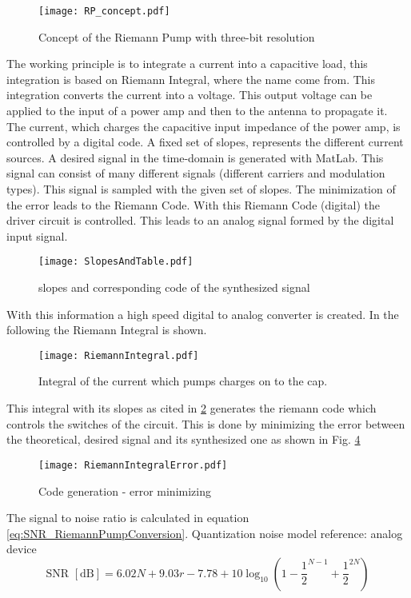 \begin{figure}[ht]
	\centering
  \texttt{[image: RP\_concept.pdf]}
	\caption{Concept of the Riemann Pump with three-bit resolution}
	\label{fig:RiemannPumpConcept}
\end{figure}

 The working principle is to integrate a current into a capacitive load, this integration is based on Riemann Integral, where the name come from. This integration converts the current into a voltage. This output voltage can be applied to the input of a power amp and then to the antenna to propagate it. The current, which charges the capacitive input impedance of the power amp, is controlled by a digital code. A fixed set of slopes, represents the different current sources. A desired signal in the time-domain is generated with MatLab. This signal can consist of many different signals (different carriers and modulation types). This signal is sampled with the given set of slopes. The minimization of the error leads to the Riemann Code. With this Riemann Code (digital) the driver circuit is controlled. This leads to an analog signal formed by the digital input signal. 
 
\begin{figure}[ht]
	\centering
  \texttt{[image: SlopesAndTable.pdf]}
	\caption{slopes and corresponding code of the synthesized signal}
	\label{fig:SlopesAndTable}
\end{figure}

With this information a high speed digital to analog converter is created. In the following the Riemann Integral is shown.

\begin{figure}[ht]
	\centering
  \texttt{[image: RiemannIntegral.pdf]}
	\caption{Integral of the current which pumps charges on to the cap.}
	\label{fig:RiemannIntegral}
\end{figure}
This integral with its slopes as cited in \ref{fig:SlopesAndTable} generates the riemann code which controls the switches of the circuit. This is done by minimizing the error between the theoretical, desired signal and its synthesized one as shown in Fig. \ref{fig:RiemannIntegralError}
 \begin{figure}[ht]
	\centering
  \texttt{[image: RiemannIntegralError.pdf]}
	\caption{Code generation - error minimizing}
	\label{fig:RiemannIntegralError}
\end{figure}
The signal to noise ratio is calculated in equation \ref{eq:SNR_RiemannPumpConversion}. Quantization noise model {reference: analog device}
\begin{equation}
	\text{SNR } [\si{\dB}] = 6.02N + 9.03r - 7.78 + 10\log_{10}(1 - \frac{1}{2}^{N-1} + \frac{1}{2}^{2N})
	\label{eq:SNR_RiemannPumpConversion}
\end{equation}



